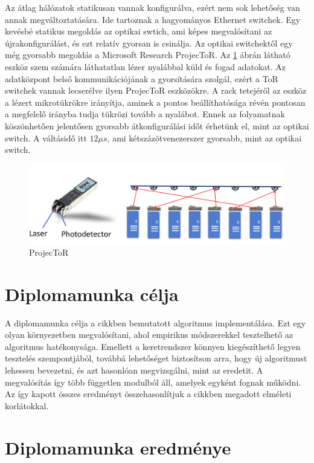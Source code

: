 \documentclass[12pt]{report}
\begin{document}
Az átlag hálózatok statikusan vannak konfigurálva, ezért nem sok lehetőség van annak megváltoztatására.
Ide tartoznak a hagyományos Ethernet switchek.
Egy kevésbé statikus megoldás az optikai swtich, ami képes megvalósítani az újrakonfigurálást, és ezt relatív gyorsan is csinálja.
Az optikai switchektől egy még gyorsabb megoldás a Microsoft Research ProjecToR. 
Az \ref{projector-fig} ábrán látható eszköz szem számára láthatatlan lézer nyalábbal küld és fogad adatokat.
Az adatközpont belső kommunikációjának a gyorsítására szolgál, ezért a ToR switchek vannak lecserélve ilyen ProjecToR eszközökre.
A rack tetejéről az eszköz a lézert mikrotükrökre irányítja, aminek a pontos beállíthatósága révén pontosan a megfelelő irányba tudja tükrözi tovább a nyalábot.
Ennek az folyamatnak köszönhetően jelentősen gyorsabb átkonfigurálási időt érhetünk el, mint az optikai switch.
A váltásidő itt $12\mu s$, ami kétszázötvenezerszer gyorsabb, mint az optikai switch.

\begin{figure}[h]
	\centering
	\includegraphics[width=0.9\linewidth]{pictures/laserswitch.png}
	\caption{ProjecToR \cite{ghobadi_projector:_2016}}
	\label{projector-fig}
\end{figure}

\section{Diplomamunka célja}

A diplomamunka célja a cikkben \cite{avin_demand-aware_nodate} bemutatott algoritmus implementálása.
Ezt egy olyan környezetben megvalósítani, ahol empirikus módszerekkel tesztelhető az algoritmus hatékonysága.
Emellett a keretrendszer könnyen kiegészíthető legyen tesztelés szempontjából, továbbá lehetőséget biztosítson arra, hogy új algoritmust lehessen bevezetni, és azt hasonlóan megvizsgálni, mint az eredetit.
A megvalósítás így több független modulból áll, amelyek egyként fognak működni.
Az így kapott összes eredményt összehasonlítjuk a cikkben megadott elméleti korlátokkal.

\section{Diplomamunka eredménye}
\end{document}
